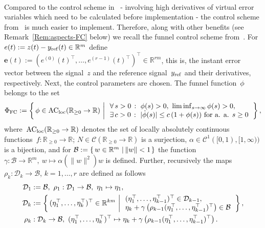 \documentclass[ envcountsect, envcountsame]{svjour3}
\newcommand{\setdef}[2]{\left\{\, #1\, \left|\, \vphantom{#1} #2 \right.\right\}}
\newcommand{\R}{\mathbb{R}}
\newcommand{\cB}{\mathcal{B}}
\newcommand{\cC}{\mathcal{C}}
\newcommand{\cD}{\mathcal{D}}
\newcommand{\rp}{\mathbb{R}_{\geq 0}}
\begin{document}
\ \\
Compared to the control scheme in~\cite{BergLe18a} - involving high derivatives of virtual error variables which need to be calculated before implementation - the control scheme from~\cite{BergIlch21} is much easier to implement.  
Therefore, along with other benefits (see Remark~\ref{Rem:aspects-FC} below) we recall the funnel control scheme from~\cite[Thm. 1.9]{BergIlch21}.
For $e(t) := z(t) - y_{\rm ref}(t) \in \R^m$ define $\textbf{e}(t) := (e^{(0)}(t)^\top,\ldots,e^{(r-1)}(t)^\top )^\top \in \R^{rm} $, this is, the instant error vector between the signal~$z$ and the reference signal~$y_{\rm ref}$ and their derivatives, respectively.
Next, the control parameters are chosen. The funnel function~$\phi$ belongs to the set
\begin{equation*}
\Phi_{\rm FC} := \setdef{ \phi \in \text{AC}_{\rm loc}(\rp \to \R)}{
\begin{array}{l}
\forall\,s >0 \,:\ \phi(s)>0, \ \liminf_{s \to \infty} \phi(s) >0, \\
\exists\, c>0\,:\ |\dot \phi(s)| \le c \, (1+\phi(s)) \text{ for a. a. } s\ge 0 
\end{array} }, 
\end{equation*}
where~$\text{AC}_{\rm loc}(\rp \to \R)$ denotes the set of locally absolutely continuous functions~$f:\rp \to \R$; %
$N \in \cC(\rp \to \R)$ is a surjection, $\alpha \in \cC^1([0,1), [1,\infty))$ is a bijection, and for $\cB := \setdef{w \in \R^m}{\|w\| < 1}$ the function ${\gamma : \cB \to \R^m, \ w \mapsto \alpha(\|w\|^2)w}$ is defined.
Further, recursively the maps $\rho_k : \cD_k \to \cB$, $k=1,\ldots,r$ are defined as follows
\begin{equation*}
\begin{aligned}
\cD_1 &:= \cB, \ \rho_1: \cD_1 \to \cB, \ \eta_1 \mapsto \eta_1, \\
\cD_k &:= \setdef{ (\eta_1^\top,\ldots,\eta_k^\top)^\top \in \R^{km}}{ 
\begin{array}{l}
(\eta_1^\top,\ldots,\eta_{k-1}^\top)^\top \in \cD_{k-1}, \\
\eta_k + \gamma \left(\rho_{k-1}(\eta_1^\top,\ldots,\eta_{k-1}^\top)^\top \right) \in \cB
\end{array}}, \\
\rho_k &:  \cD_k \to \cB, \ (\eta_1^\top,\ldots,\eta_k^\top)^\top \mapsto \eta_k + \gamma \left(\rho_{k-1}(\eta_1^\top,\ldots,\eta_{k-1}^\top)^\top\right).
\end{aligned}
\end{equation*}
\end{document}
